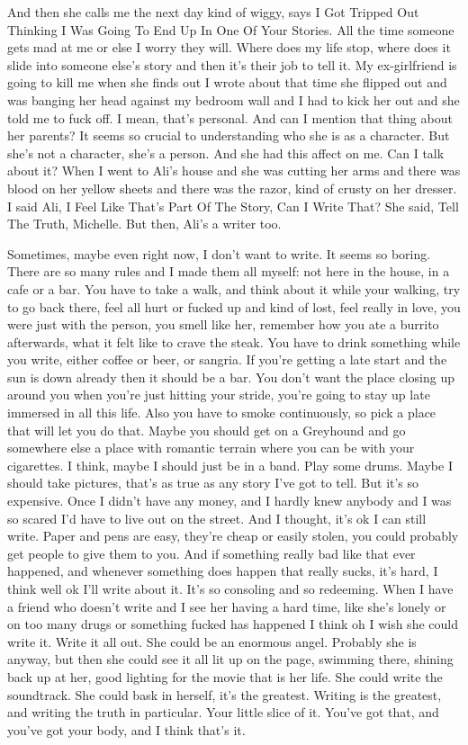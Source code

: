 \documentclass[
]{memoir}
\begin{document}
And then she calls me the next day kind of wiggy, says I Got Tripped Out
Thinking I Was Going To End Up In One Of Your Stories. All the time
someone gets mad at me or else I worry they will. Where does my life
stop, where does it slide into someone else's story and then it's their
job to tell it. My ex-girlfriend is going to kill me when she finds out
I wrote about that time she flipped out and was banging her head against
my bedroom wall and I had to kick her out and she told me to fuck off. I
mean, that's personal. And can I mention that thing about her parents?
It seems so crucial to understanding who she is as a character. But
she's not a character, she's a person. And she had this affect on me.
Can I talk about it? When I went to Ali's house and she was cutting her
arms and there was blood on her yellow sheets and there was the razor,
kind of crusty on her dresser. I said Ali, I Feel Like That's Part Of
The Story, Can I Write That? She said, Tell The Truth, Michelle. But
then, Ali's a writer too.

Sometimes, maybe even right now, I don't want to write. It seems so
boring. There are so many rules and I made them all myself: not here in
the house, in a cafe or a bar. You have to take a walk, and think about
it while your walking, try to go back there, feel all hurt or fucked up
and kind of lost, feel really in love, you were just with the person,
you smell like her, remember how you ate a burrito afterwards, what it
felt like to crave the steak. You have to drink something while you
write, either coffee or beer, or sangria. If you're getting a late start
and the sun is down already then it should be a bar. You don't want the
place closing up around you when you're just hitting your stride, you're
going to stay up late immersed in all this life. Also you have to smoke
continuously, so pick a place that will let you do that. Maybe you
should get on a Greyhound and go somewhere else a place with romantic
terrain where you can be with your cigarettes. I think, maybe I should
just be in a band. Play some drums. Maybe I should take pictures, that's
as true as any story I've got to tell. But it's so expensive. Once I
didn't have any money, and I hardly knew anybody and I was so scared I'd
have to live out on the street. And I thought, it's ok I can still
write. Paper and pens are easy, they're cheap or easily stolen, you
could probably get people to give them to you. And if something really
bad like that ever happened, and whenever something does happen that
really sucks, it's hard, I think well ok I'll write about it. It's so
consoling and so redeeming. When I have a friend who doesn't write and I
see her having a hard time, like she's lonely or on too many drugs or
something fucked has happened I think oh I wish she could write it.
Write it all out. She could be an enormous angel. Probably she is
anyway, but then she could see it all lit up on the page, swimming
there, shining back up at her, good lighting for the movie that is her
life. She could write the soundtrack. She could bask in herself, it's
the greatest. Writing is the greatest, and writing the truth in
particular. Your little slice of it. You've got that, and you've got
your body, and I think that's it.
\end{document}
